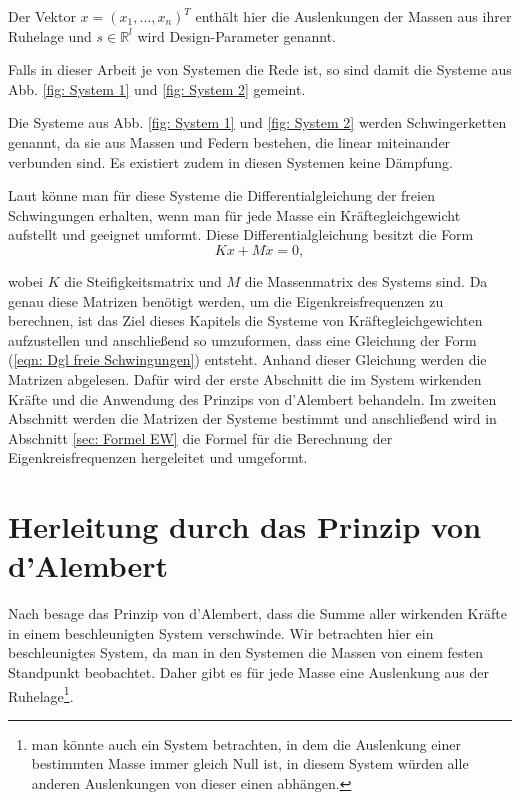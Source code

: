 \documentclass[a4paper,12pt]{report}
\newcommand{\R}{\mathbb R}
\newcommand{\zitat}[1]{\glqq #1\grqq}
\newcommand{\1}{\mathds{1}}
\theoremstyle{plain} %
\theoremstyle{definition} %
\theoremstyle{remark}
\begin{document}
      Der Vektor $x = (x_1,\dots,x_n)^T$ enthält hier die Auslenkungen der Massen aus ihrer Ruhelage und $s\in\R^l$ wird Design-Parameter genannt.

      Falls in dieser Arbeit je von \zitat{Systemen} die Rede ist, so sind damit die Systeme aus Abb. \ref{fig: System 1} und \ref{fig: System 2} gemeint.

      Die Systeme aus Abb. \ref{fig: System 1} und \ref{fig: System 2} werden \zitat{Schwingerketten} \cite[S. 236]{maschinendynamikDresig} genannt,
      da sie aus Massen und Federn bestehen, die linear miteinander verbunden sind.
      Es existiert zudem in diesen Systemen keine Dämpfung.
      
      Laut \cite[S. 362-365]{maschinendynamikDresig} könne man für diese Systeme die \zitat{Differentialgleichung der freien Schwingungen} \cite[S. 365]{maschinendynamikDresig}
      erhalten, wenn man für jede Masse ein \linebreak Kräftegleichgewicht aufstellt und geeignet umformt.
      Diese Differentialgleichung besitzt die Form
      \begin{equation}
            \label{eqn: Dgl freie Schwingungen}
            Kx+M\ddot x = 0,
      \end{equation}

      wobei $K$ die Steifigkeitsmatrix und $M$ die Massenmatrix des Systems sind.
      Da genau diese Matrizen benötigt werden, um die Eigenkreisfrequenzen zu berechnen, ist das Ziel dieses Kapitels die Systeme von Kräftegleichgewichten
      aufzustellen und anschließend so umzuformen, dass eine Gleichung der Form (\ref{eqn: Dgl freie Schwingungen}) entsteht.
      Anhand dieser Gleichung werden die Matrizen abgelesen.
      Dafür wird der erste Abschnitt die im System wirkenden Kräfte und die Anwendung des Prinzips von d'Alembert behandeln.
      Im zweiten Abschnitt werden die Matrizen der Systeme bestimmt und anschließend wird in Abschnitt \ref{sec: Formel EW}
      die Formel für die Berechnung der Eigenkreisfrequenzen hergeleitet und umgeformt. 
      
      \section{Herleitung durch das Prinzip von d'Alembert}
            Nach \cite{d_AlembertPrinzip} besage das Prinzip von d'Alembert, dass die Summe aller wirkenden Kräfte in einem beschleunigten System verschwinde.
            Wir betrachten hier ein beschleunigtes System, da man in den Systemen die Massen von einem festen Standpunkt beobachtet.
            Daher gibt es für jede Masse eine Auslenkung aus der Ruhelage\footnote{man könnte auch ein System betrachten,
            in dem die Auslenkung einer bestimmten Masse immer gleich Null ist, in diesem System würden alle anderen Auslenkungen von dieser einen abhängen.}.
\end{document}
